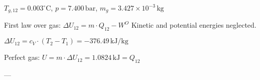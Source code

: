 \( T_{g,12} = 0.003^\circ \text{C} \), \( p = 7.400 \, \text{bar} \), \( m_g = 3.427 \times 10^{-3} \, \text{kg} \)  

First law over gas:  
\( \Delta U_{12} = m \cdot Q_{12} - W^O \)  
Kinetic and potential energies neglected.  

\( \Delta U_{12} = c_V \cdot (T_2 - T_1) = -376.49 \, \text{kJ/kg} \)  

Perfect gas:  
\( U = m \cdot \Delta U_{12} = 1.0824 \, \text{kJ} = Q_{12} \)  

---